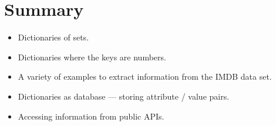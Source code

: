 \documentclass[letterpaper,10pt,english]{sphinxmanual}
\begin{document}
\section{Summary}
\label{\detokenize{lecture_notes/lec17_dictionaries2:summary}}\begin{itemize}
\item {} 
Dictionaries of sets.

\item {} 
Dictionaries where the keys are numbers.

\item {} 
A variety of examples to extract information from the IMDB data set.

\item {} 
Dictionaries as database — storing attribute / value pairs.

\item {} 
Accessing information from public APIs.

\end{itemize}
\end{document}
